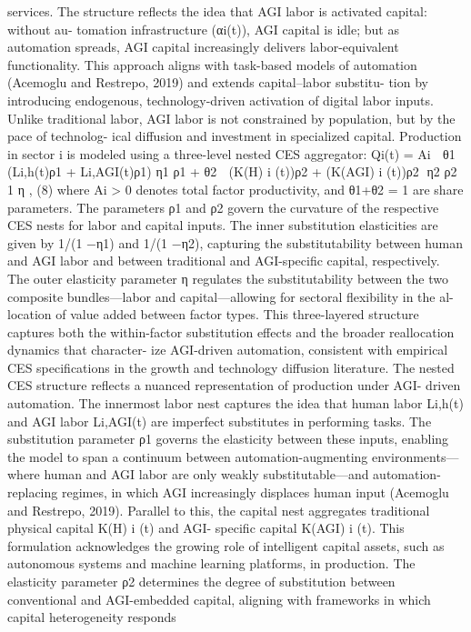 services. The structure reflects the idea that AGI labor is activated capital: without au-
tomation infrastructure (αi(t)), AGI capital is idle; but as automation spreads, AGI capital
increasingly delivers labor-equivalent functionality. This approach aligns with task-based
models of automation (Acemoglu and Restrepo, 2019) and extends capital–labor substitu-
tion by introducing endogenous, technology-driven activation of digital labor inputs. Unlike
traditional labor, AGI labor is not constrained by population, but by the pace of technolog-
ical diffusion and investment in specialized capital.
Production in sector i is modeled using a three-level nested CES aggregator:
Qi(t) = Ai

θ1 (Li,h(t)ρ1 + Li,AGI(t)ρ1)
η1
ρ1
+ θ2

(K(H)
i
(t))ρ2 + (K(AGI)
i
(t))ρ2 η2
ρ2
 1
η
,
(8)
where Ai > 0 denotes total factor productivity, and θ1+θ2 = 1 are share parameters. The
parameters ρ1 and ρ2 govern the curvature of the respective CES nests for labor and capital
inputs. The inner substitution elasticities are given by 1/(1 −η1) and 1/(1 −η2), capturing
the substitutability between human and AGI labor and between traditional and AGI-specific
capital, respectively. The outer elasticity parameter η regulates the substitutability between
the two composite bundles—labor and capital—allowing for sectoral flexibility in the al-
location of value added between factor types. This three-layered structure captures both
the within-factor substitution effects and the broader reallocation dynamics that character-
ize AGI-driven automation, consistent with empirical CES specifications in the growth and
technology diffusion literature.
The nested CES structure reflects a nuanced representation of production under AGI-
driven automation. The innermost labor nest captures the idea that human labor Li,h(t)
and AGI labor Li,AGI(t) are imperfect substitutes in performing tasks. The substitution
parameter ρ1 governs the elasticity between these inputs, enabling the model to span a
continuum between automation-augmenting environments—where human and AGI labor
are only weakly substitutable—and automation-replacing regimes, in which AGI increasingly
displaces human input (Acemoglu and Restrepo, 2019).
Parallel to this, the capital nest aggregates traditional physical capital K(H)
i
(t) and AGI-
specific capital K(AGI)
i
(t).
This formulation acknowledges the growing role of intelligent
capital assets, such as autonomous systems and machine learning platforms, in production.
The elasticity parameter ρ2 determines the degree of substitution between conventional and
AGI-embedded capital, aligning with frameworks in which capital heterogeneity responds
